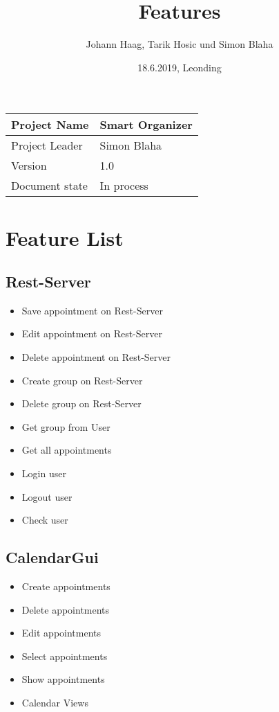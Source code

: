 \documentclass[12pt]{scrartcl}
\title{Features}
\author{Johann Haag, Tarik Hosic und Simon Blaha}
\date{18.6.2019, Leonding}
\begin{document}
    \maketitle
    \begin{flushleft}
    \begin{tabular}{|l|l|}
    \hline
    Project Name & Smart Organizer \\ \hline
    Project Leader & Simon Blaha \\ \hline
    Version & 1.0\\ \hline
    Document state & In process \\ \hline
    \end{tabular}
    \end{flushleft}

    \pagebreak
    \tableofcontents
    \pagebreak

    \section{Feature List}
    \subsection{Rest-Server}
    \begin{itemize}
        \item Save appointment on Rest-Server
        \item Edit appointment on Rest-Server
        \item Delete appointment on Rest-Server
        \item Create group on Rest-Server
        \item Delete group on Rest-Server
        \item Get group from User
        \item Get all appointments
        \item Login user 
        \item Logout user 
        \item Check user
    \end{itemize}
    \subsection{CalendarGui}
    \begin{itemize}
        \item Create appointments
        \item Delete appointments
        \item Edit appointments
        \item Select appointments
        \item Show appointments
        \item Calendar Views
    \end{itemize}
\end{document}
